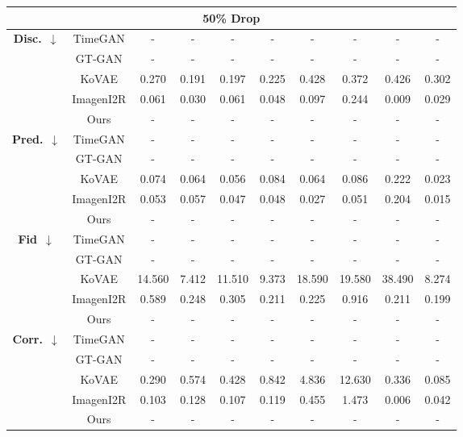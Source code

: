 \documentclass{article}
\theoremstyle{plain}
\theoremstyle{definition}
\theoremstyle{remark}
\begin{document}
\begin{table}[!t]
{\begin{tabular}{cc|cccccccc}
    \multicolumn{10}{c}{\textbf{50\% Drop}} \\
    \midrule
    \multirow{5}{*}{\textbf{Disc.}~$\downarrow$}
      & TimeGAN & - & - & - & - & - & - & - & - \\
      & GT-GAN  & - & - & - & - & - & - & - & - \\
      & KoVAE 
          & 0.270 
          & 0.191 
          & 0.197 
          & 0.225 
          & 0.428 
          & 0.372 
          & 0.426 
          & 0.302 \\
      & ImagenI2R  
          & 0.061
          & 0.030
          & 0.061
          & 0.048
          & 0.097
          & 0.244
          & 0.009
          & 0.029 \\
    & Ours
       & - & - & - & - & - & - & - & - \\
    \midrule
    \multirow{5}{*}{\textbf{Pred.}~$\downarrow$}
      & TimeGAN & - & - & - & - & - & - & - & - \\
      & GT-GAN  & - & - & - & - & - & - & - & - \\
      & KoVAE 
          & 0.074 
          & 0.064 
          & 0.056 
          & 0.084 
          & 0.064 
          & 0.086 
          & 0.222 
          & 0.023 \\
      & ImagenI2R  
          & 0.053
          & 0.057
          & 0.047
          & 0.048
          & 0.027
          & 0.051
          & 0.204
          & 0.015 \\
    & Ours
       & - & - & - & - & - & - & - & - \\
    \midrule
    \multirow{5}{*}{\textbf{Fid}~$\downarrow$}
      & TimeGAN & - & - & - & - & - & - & - & - \\
      & GT-GAN  & - & - & - & - & - & - & - & - \\
      & KoVAE 
          & 14.560 
          & 7.412 
          & 11.510 
          & 9.373 
          & 18.590 
          & 19.580 
          & 38.490 
          & 8.274 \\
      & ImagenI2R  
          & 0.589
          & 0.248
          & 0.305
          & 0.211
          & 0.225
          & 0.916
          & 0.211
          & 0.199 \\
    & Ours
       & - & - & - & - & - & - & - & - \\
    \midrule
    \multirow{5}{*}{\textbf{Corr.}~$\downarrow$}
      & TimeGAN & - & - & - & - & - & - & - & - \\
      & GT-GAN  & - & - & - & - & - & - & - & - \\
      & KoVAE 
          & 0.290 
          & 0.574 
          & 0.428 
          & 0.842 
          & 4.836 
          & 12.630 
          & 0.336 
          & 0.085 \\
      & ImagenI2R  
          & 0.103
          & 0.128
          & 0.107
          & 0.119
          & 0.455
          & 1.473
          & 0.006
          & 0.042 \\
    & Ours
       & - & - & - & - & - & - & - & - \\
    \midrule
    

\end{tabular}}
\end{table}
\end{document}
